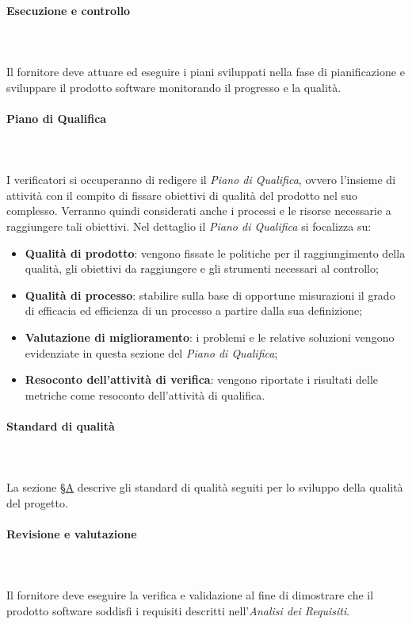 			\paragraph{Esecuzione e controllo} \mbox{} \\ \mbox{} \\
Il fornitore deve attuare ed eseguire i piani sviluppati nella fase di pianificazione e sviluppare il prodotto software monitorando il progresso e la qualità.
			\paragraph*{Piano di Qualifica} \mbox{} \\ \mbox{} \\
			I verificatori si occuperanno di redigere il \textit{Piano di Qualifica}, ovvero l'insieme di attività con il compito di fissare obiettivi di qualità del prodotto nel suo complesso. Verranno quindi considerati anche i processi e le risorse necessarie a raggiungere tali obiettivi. Nel dettaglio il \textit{Piano di Qualifica} si focalizza su:
			\begin{itemize}
				\item \textbf{Qualità di prodotto}: vengono fissate le politiche per il raggiungimento della qualità, gli obiettivi da raggiungere e gli strumenti necessari al controllo;
				\item \textbf{Qualità di processo}: stabilire sulla base di opportune misurazioni il grado di efficacia ed efficienza di un processo a partire dalla sua definizione;
				\item \textbf{Valutazione di miglioramento}: i problemi e le relative soluzioni vengono evidenziate in questa sezione del \textit{Piano di Qualifica};
				\item \textbf{Resoconto dell'attività di verifica}: vengono riportate i risultati delle metriche come resoconto dell'attività di qualifica.
			\end{itemize}
			
			\paragraph*{Standard di qualità} \mbox{} \\ \mbox{} \\
			La sezione \S \hyperref[sez:standardQualita]{A} descrive gli standard di qualità seguiti per lo sviluppo della qualità del progetto.
			
			\paragraph{Revisione e valutazione} \mbox{} \\ \mbox{} \\
			Il fornitore deve eseguire la verifica e validazione al fine di dimostrare che il prodotto software soddisfi i requisiti descritti nell'\textit{Analisi dei Requisiti}.
